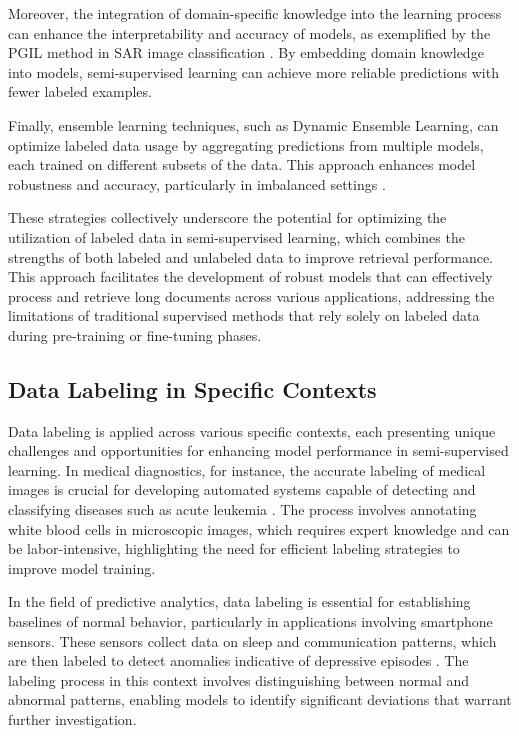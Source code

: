 Moreover, the integration of domain-specific knowledge into the learning process can enhance the interpretability and accuracy of models, as exemplified by the PGIL method in SAR image classification \cite{huang2022physicallyexplainablecnnsar}. By embedding domain knowledge into models, semi-supervised learning can achieve more reliable predictions with fewer labeled examples.



Finally, ensemble learning techniques, such as Dynamic Ensemble Learning, can optimize labeled data usage by aggregating predictions from multiple models, each trained on different subsets of the data. This approach enhances model robustness and accuracy, particularly in imbalanced settings \cite{pasarkar2024cousinsvendiscorefamily}.



These strategies collectively underscore the potential for optimizing the utilization of labeled data in semi-supervised learning, which combines the strengths of both labeled and unlabeled data to improve retrieval performance. This approach facilitates the development of robust models that can effectively process and retrieve long documents across various applications, addressing the limitations of traditional supervised methods that rely solely on labeled data during pre-training or fine-tuning phases. \cite{ginzburg2021selfsuperviseddocumentsimilarityranking,jang2024visualdeltageneratorlarge}



\subsection{Data Labeling in Specific Contexts} \label{subsec:Data Labeling in Specific Contexts}

Data labeling is applied across various specific contexts, each presenting unique challenges and opportunities for enhancing model performance in semi-supervised learning. In medical diagnostics, for instance, the accurate labeling of medical images is crucial for developing automated systems capable of detecting and classifying diseases such as acute leukemia \cite{zolfaghari2023surveyautomateddetectionclassification}. The process involves annotating white blood cells in microscopic images, which requires expert knowledge and can be labor-intensive, highlighting the need for efficient labeling strategies to improve model training.



In the field of predictive analytics, data labeling is essential for establishing baselines of normal behavior, particularly in applications involving smartphone sensors. These sensors collect data on sleep and communication patterns, which are then labeled to detect anomalies indicative of depressive episodes \cite{jeong2016predictiveanalyticsusingsmartphone}. The labeling process in this context involves distinguishing between normal and abnormal patterns, enabling models to identify significant deviations that warrant further investigation.



